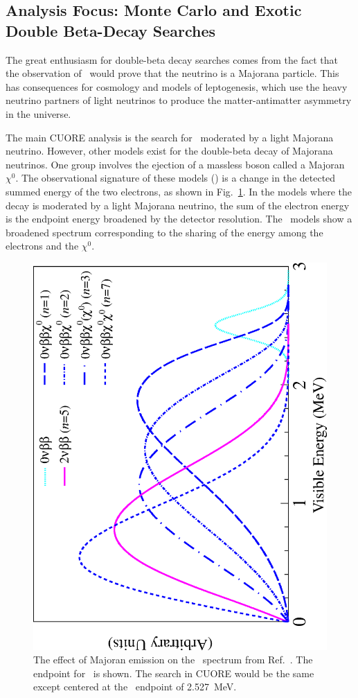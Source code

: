 \subsection{Analysis Focus: Monte Carlo and Exotic Double Beta-Decay Searches}
The great enthusiasm for double-beta decay searches comes from the fact that the observation of \zeronu~would prove that the neutrino is a Majorana particle. This has consequences for cosmology and models of leptogenesis, which use the heavy neutrino partners of light neutrinos to produce the matter-antimatter asymmetry in the universe. 

The main CUORE analysis is the search for \zeronu~moderated by a light Majorana neutrino.  However, other models exist for the double-beta decay of Majorana neutrinos. One group involves the ejection of a massless boson called a Majoran $\chi^{0}$. The observational signature of these models (\maj) is a change in the detected summed energy of the two electrons, as shown in Fig.~\ref{majoran}.  In the models where the decay is moderated by a light Majorana neutrino, the sum of the electron energy is the endpoint energy broadened by the detector resolution. The \maj~models show a broadened spectrum corresponding to the sharing of the energy among the electrons and the $\chi^{0}$. 

\begin{figure}
\begin{center}
\includegraphics[angle=270, width=0.58\columnwidth]{fig1} 
\end{center}
\caption{\label{majoran}The effect of Majoran emission on the \zeronu~spectrum from Ref.~\cite{KZMaj}. The endpoint for \isoxe~is shown. The search in CUORE would be the same except centered at the \isomain~endpoint of 2.527~MeV. }
\end{figure}

